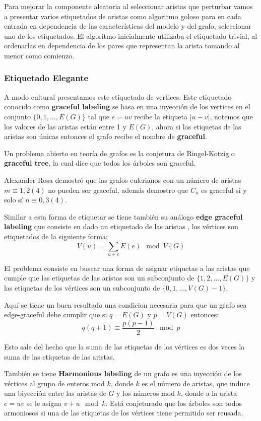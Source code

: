 \documentclass[a4paper]{article}
\begin{document}
Para mejorar la componente aleatoria al seleccionar aristas que perturbar vamos a presentar varios etiquetados de aristas como algoritmo goloso para en cada entrada en dependencia de las caracter\'isticas del modelo y del grafo, seleccionar uno de los etiquetados. El algoritmo inicialmente utilizaba el etiquetado trivial, al ordenarlas en dependencia de los pares que representan la arista tomando al menor como comienzo.

\subsubsection{Etiquetado Elegante}

A modo cultural presentamos este etiquetado de vertices. Este etiquetado conocido como \textbf{graceful labeling} se basa en una inyecci\'on de los vertices en el conjunto $\{0, 1, ..., E(G)\}$ tal que $e=uv$ recibe la etiqueta $|u - v|$, notemos que los valores de las aristas est\'an entre 1 y $E(G)$, ahora si las etiquetas de las aristas son \'unicas entonces el grafo recibe el nombre de \textbf{graceful}.

Un problema abierto en teor\'ia de grafos es la conjetura de Ringel-Kotzig o  \textbf{graceful tree}, la cual dice que todos los \'arboles son graceful.

Alexander Rosa demostr\'o que las grafos eulerianos con un n\'umero de aristas $m \equiv 1, 2 (4)$ no pueden ser graceful, adem\'as demostro que $C_n$ es graceful si y solo s\'i $n \equiv 0,3 (4)$.

Similar a esta forma de etiquetar se tiene tambi\'en su an\'alogo \textbf{edge graceful labeling} que consiste en dado un etiquetado de las aristas , los v\'ertices son etiquetados de la siguiente forma:
$$ V(u) = \sum_{u \in e} E(e) \mod V(G)$$

El problema consiste en buscar una forma de asignar etiquetas a las aristas que cumple que las etiquetas de las aristas son un subconjunto de $\{1,2, ..., E(G)\}$ y las etiquetas de los v\'ertices son un subconjunto de $\{0, 1, ..., V(G)-1\}$.

Aqu\'i se tiene un buen resultado una condicion necesaria para que un grafo sea edge-graceful debe cumplir que si $q = E(G)$ y $p = V(G)$ entonces:
$$q(q+1) \equiv \frac{p(p-1)}{2} \mod p$$

Esto sale del hecho que la suma de las etiquetas de los v\'ertices es dos veces la suma de las etiquetas de las aristas.

Tambi\'en se tiene \textbf{Harmonious labeling} de un grafo es una inyecci\'on de los v\'ertices al grupo de enteros mod  $k$, donde $k$ es el n\'umero de aristas, que induce una biyecci\'on entre las aristas de $G$ y los n\'umeros mod $k$, donde a la arista $e=uv$ se le asigna $v+u \mod k$. Est\'a conjeturado que los \'arboles son todos armoniosos si una de las etiquetas de los v\'ertices tiene permitido ser reusada.
\end{document}

